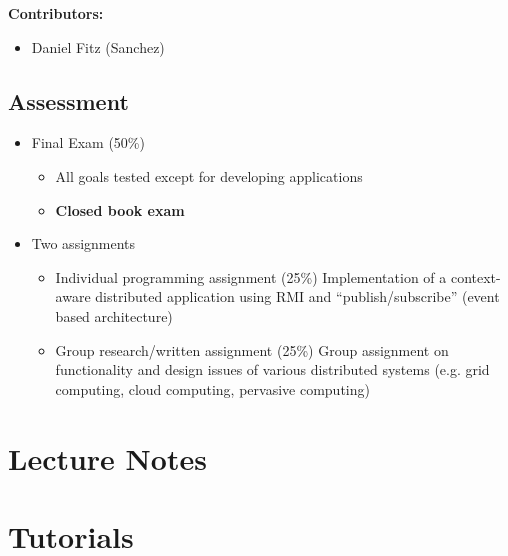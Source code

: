 \documentclass[12pt, a4paper]{report}
\begin{document}
	\tableofcontents
	\vspace{2em}
	\textbf{Contributors:}
	\begin{itemize}
		\item Daniel Fitz (Sanchez)
	\end{itemize}
	\section{Assessment}
	\begin{itemize}
		\item Final Exam (50\%)
		\begin{itemize}
			\item All goals tested except for developing applications
			\item\textbf{Closed book exam}
		\end{itemize}
		\item Two assignments
		\begin{itemize}
			\item Individual programming assignment (25\%)
			\subitem Implementation of a context-aware distributed application using RMI and ``publish/subscribe'' (event based architecture)
			\item Group research/written assignment (25\%)
			\subitem Group assignment on functionality and design issues of various distributed systems (e.g. grid computing, cloud computing, pervasive computing)
		\end{itemize}
	\end{itemize}

	\newpage

\begin{multicols}{2}

\chapter{Lecture Notes}










\chapter{Tutorials}


\end{multicols}
\end{document}
